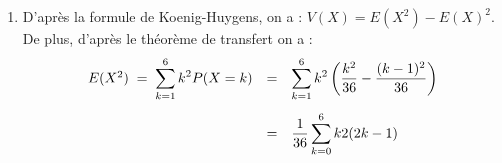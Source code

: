 \documentclass[a4paper, 11pt,reqno]{article}
\begin{document}
\begin{correction}
\begin{enumerate}
$$\begin{array}{rcl}
				                                              & = & \ddp \frac{2}{36} \sum_{k=0}^6 k^2 - \frac{1}{36} \sum_{k=0}^6 k\vsec                  \\
				                                              & = & \ddp \frac{2}{36} \times \frac{6(6+1)(12+1)}{6} - \frac{1}{36} \times \frac{6(6+1)}{2}
			      \end{array}$$
		      en utilisant les formules usuelles de sommes.\vsec\\
		      On obtient donc : .\\
		      De m\^eme, on a
		      $$\begin{array}{rcl}
				      E(Y) \; = \; \ddp \sum_{k=1}^6 k P(Y=k) & = & \ddp  \sum_{k=1}^6 k \left(\frac{(6-(k-1))^2}{36}-\frac{(6-k)^2}{36}\right)\vsec          \\
				                                              & = & \ddp   \frac{1}{36} \sum_{k=1}^6 k ((6-k)^2 + 2(6-k) + 1 - (6-k)^2)\vsec                  \\
				                                              & = & \ddp   \frac{1}{36} \sum_{k=1}^6 k (13-2k)\vsec                                           \\
				                                              & = & \ddp   \frac{13}{36} \sum_{k=1}^6 k - \frac{2}{36} \sum_{k=1}^6 k^2\vsec                  \\
				                                              & = & \ddp   \frac{13}{36} \times \frac{6(6+1)}{2} - \frac{2}{36} \times \frac{6(6+1)(12+1)}{6}
			      \end{array}$$
		      soit . On v\'erifie que l'on a bien $E(X) >E(Y)$, ce qui est normal, car la valeur moyenne du plus grand num\'ero doit \^etre sup\'erieure \`a la valeur moyenne du plus petit num\'ero.\vsec\\
		\item D'apr\`es la formule de Koenig-Huygens, on a : $V(X) = E(X^2)-E(X)^2$. De plus, d'apr\`es le th\'eor\`eme de transfert on a :
		      $$\begin{array}{rcl}
				      E(X^2) \; = \; \ddp \sum_{k=1}^6 k^2 P(X=k) & = & \ddp  \sum_{k=1}^6 k^2 \left(\frac{k^2}{36}-\frac{(k-1)^2}{36}\right)\vsec                            \\
				                                                  & = & \ddp \frac{1}{36} \sum_{k=0}^6 k2(2k-1)\vsec                                                          \\

\end{array}$$
\end{enumerate}
\end{correction}
\end{document}
